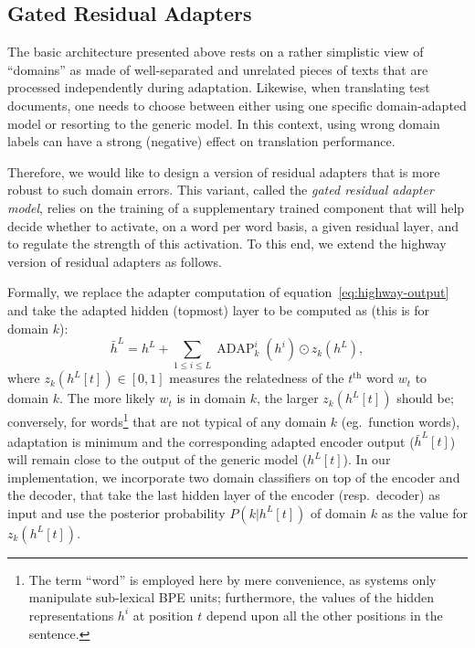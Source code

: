 \documentclass[11pt,a4paper]{article}
\newcommand{\fyDone}[1]{\done[FY]\Todo[FY:]{\textcolor{orange}{#1}}}
\newcommand{\mpDone}[1]{\done[MP]\Todo[MP:]{\textcolor{green}{#1}}}
\begin{document}
\subsection{Gated Residual Adapters \label{ssec:gate}}
\mpDone{Formalizing problem, network design, training algorithm}
The basic architecture presented above rests on a rather simplistic view of ``domains'' as made of well-separated and unrelated pieces of texts that are processed independently during adaptation. Likewise, when translating test documents, one needs to choose between either using one specific domain-adapted model or resorting to the generic model. In this context, using wrong domain labels can have a strong (negative) effect on translation performance. 

Therefore, we would like to design a version of residual adapters that is more robust to such domain errors. This variant, called the \emph{gated residual adapter model}, relies on the training of a supplementary trained component that will help decide whether to activate, on a word per word basis, a given residual layer, and to regulate the strength of this activation. To this end, we extend the highway version of residual adapters as follows.
\fyDone{Consistency of notations wrt section 2.1}

Formally, we replace the adapter computation of equation~\eqref{eq:highway-output} and take the adapted hidden (topmost) layer to be computed as (this is for domain $k$):
\begin{equation}
  \bar{h}^L = h^L + \displaystyle{\mathop{\sum}_{1 \leq i \leq L} \operatorname{ADAP}_k^i(h^i) \odot{} z_k(h^L)}, \label{eq:gated-output}
\end{equation}
where $z_k(h^L[t]) \in [0,1]$ measures the relatedness of the $t^{\text{th}}$ word $w_t$ to domain $k$. The more likely $w_t$ is in domain $k$, the larger $z_k(h^L[t])$ should be; conversely, for words\footnote{The term ``word'' is employed here by mere convenience, as systems only manipulate sub-lexical BPE units; furthermore, the values of the hidden representations $h^{i}$ at position $t$ depend upon all the other positions in the sentence.} that are not typical of any domain $k$ (eg.\ function words),  adaptation is minimum and the corresponding adapted encoder output ($\bar{h}^L[t]$) will remain close to the output of the generic model ($h^L[t]$). In our implementation, we incorporate two domain classifiers on top of the encoder and the decoder, that take the last hidden layer of the encoder (resp.\ decoder) as input and use the posterior probability $P(k|h^L[t])$ of domain $k$ as the value for $z_k(h^L[t])$.
\end{document}
